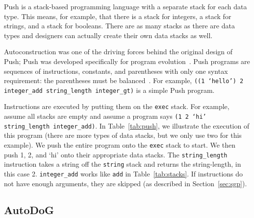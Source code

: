 \documentclass{sig-alternate}
\begin{document}
Push is a stack-based programming language with a separate stack for each data type. This means, for example, that there is a stack for integers, a stack for strings, and a stack for booleans. There are as many stacks as there are data types and designers can actually create their own data stacks as well.

Autoconstruction was one of the driving forces behind the original design of Push; Push was developed specifically for program evolution~\cite{spector:2016}. Push programs are sequences of instructions, constants, and parentheses with only one syntax requirement: the parentheses must be balanced~\cite{lee:2001}. For example, \texttt{((1 `hello') 2 integer\_add string\_length integer\_gt)} is a simple Push program.

Instructions are executed by putting them on the \texttt{exec} stack. For example, assume all stacks are empty and assume a program says \texttt{(1 2 `hi' string\_\-length integer\_add)}. In Table~\ref{tab:push}, we illustrate the execution of this program (there are more types of data stacks, but we only use two for this example). We push the entire program onto the \texttt{exec} stack to start. We then push 1, 2, and `hi' onto their appropriate data stacks. The \texttt{string\_length} instruction takes a string off the \texttt{string} stack and returns the string-length, in this case 2. \texttt{integer\_add} works like \texttt{add} in Table~\ref{tab:stacks}. If instructions do not have enough arguments, they are skipped (as described in Section~\ref{sec:sgp}).~\cite{lee:tutorial}


\subsection{AutoDoG}
\label{sec:autodog}
\end{document}
